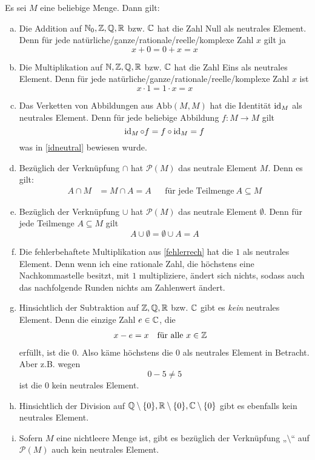 \begin{bsp} \label{neutralbsp}
Es sei $M$ eine beliebige Menge. Dann gilt:
 \begin{enumerate}[a)]
  \item Die Addition auf ${\mathbb N}_0,{\mathbb Z},{\mathbb Q},{\mathbb R}$ bzw. ${\mathbb C}$ hat die Zahl Null als neutrales Element. Denn für jede natürliche/ganze/rationale/reelle/komplexe Zahl $x$ gilt ja
  \[ x+0=0+x=x \]
  \item Die Multiplikation auf ${\mathbb N},{\mathbb Z},{\mathbb Q},{\mathbb R}$ bzw. ${\mathbb C}$ hat die Zahl Eins als neutrales Element. Denn für jede natürliche/ganze/rationale/reelle/komplexe Zahl $x$ ist
  \[ x\cdot 1=1\cdot x = x \]
  \item Das Verketten von Abbildungen aus $\text{Abb}(M,M)$ hat die Identität $\operatorname{id}_M$ als neutrales Element. Denn für jede beliebige Abbildung $f:M\to M$ gilt
  \[ \operatorname{id}_M\circ f = f\circ \operatorname{id}_M = f \]
  was in \cref{idneutral} bewiesen wurde.
  \item Bezüglich der Verknüpfung $\cap$ hat $\mathcal{P}(M)$ das neutrale Element $M$. Denn es gilt:
  \begin{align*}
   A\cap M & = M\cap A = A && \text{für jede Teilmenge}\ A\subseteq M
  \end{align*}
  \item Bezüglich der Verknüpfung $\cup$ hat $\mathcal{P}(M)$ das neutrale Element $\emptyset$. Denn für jede Teilmenge $A\subseteq M$ gilt
  \[ A\cup \emptyset = \emptyset \cup A = A \]
  \item Die fehlerbehaftete Multiplikation aus \cref{fehlerrech} hat die $1$ als neutrales Element. Denn wenn ich eine rationale Zahl, die höchstens eine Nachkommastelle besitzt, mit $1$ multipliziere, ändert sich nichts, sodass auch das nachfolgende Runden nichts am Zahlenwert ändert.
  \item Hinsichtlich der Subtraktion auf ${\mathbb Z},{\mathbb Q},{\mathbb R}$ bzw. ${\mathbb C}$ gibt es \emph{kein} neutrales Element. Denn die einzige Zahl $e\in {\mathbb C}$, die
  \begin{align*}
    x-e&=x && \text{für alle}\ x\in {\mathbb Z} 
  \end{align*}
  erfüllt, ist die $0$. Also käme höchstens die $0$ als neutrales Element in Betracht. Aber z.B. wegen
  \[ 0-5 \neq 5 \]
  ist die $0$ kein neutrales Element.
  \item Hinsichtlich der Division auf ${\mathbb Q}\setminus \{0\},{\mathbb R}\setminus \{0\},{\mathbb C}\setminus \{0\}$ gibt es ebenfalls kein neutrales Element.
  \item Sofern $M$ eine nichtleere Menge ist, gibt es bezüglich der Verknüpfung „$\setminus$“ auf $\mathcal{P}(M)$ auch kein neutrales Element.
 \end{enumerate}
\end{bsp}



